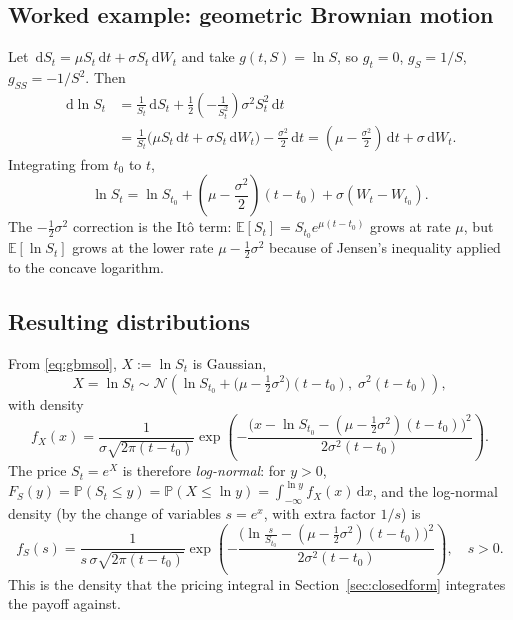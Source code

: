 \documentclass[11pt]{article}
\newcommand{\E}{\mathbb{E}}
\newcommand{\dd}{\,\mathrm{d}}
\begin{document}
\subsection{Worked example: geometric Brownian motion}
Let $\dd S_t = \mu S_t \dd t + \sigma S_t \dd W_t$ and take $g(t,S) = \ln S$, so $g_t = 0$,
$g_S = 1/S$, $g_{SS} = -1/S^2$. Then
\begin{align}
\dd \ln S_t
&= \frac{1}{S_t}\dd S_t + \tfrac12\left(-\frac{1}{S_t^2}\right)\sigma^2 S_t^2 \dd t \nonumber\\
&= \frac{1}{S_t}\bigl(\mu S_t \dd t + \sigma S_t \dd W_t\bigr) - \frac{\sigma^2}{2}\dd t
= \left(\mu - \frac{\sigma^2}{2}\right)\dd t + \sigma \dd W_t.
\end{align}
Integrating from $t_0$ to $t$,
\begin{equation}\label{eq:gbmsol}
\ln S_t = \ln S_{t_0} + \left(\mu - \frac{\sigma^2}{2}\right)(t-t_0) + \sigma (W_t - W_{t_0}).
\end{equation}
The $-\tfrac12\sigma^2$ correction is the It\^o term: $\E[S_t] = S_{t_0}e^{\mu(t-t_0)}$ grows at rate
$\mu$, but $\E[\ln S_t]$ grows at the lower rate $\mu-\tfrac12\sigma^2$ because of Jensen's inequality
applied to the concave logarithm.

\subsection{Resulting distributions}
From \eqref{eq:gbmsol}, $X := \ln S_t$ is Gaussian,
\begin{equation}
X = \ln S_t \sim \mathcal N\!\left(\ln S_{t_0} + \bigl(\mu - \tfrac12\sigma^2\bigr)(t-t_0),\;
\sigma^2 (t-t_0)\right),
\end{equation}
with density
\begin{equation}
f_X(x) = \frac{1}{\sigma\sqrt{2\pi(t-t_0)}}
\exp\!\left(-\frac{\bigl(x - \ln S_{t_0} - (\mu-\tfrac12\sigma^2)(t-t_0)\bigr)^2}{2\sigma^2(t-t_0)}\right).
\end{equation}
The price $S_t = e^{X}$ is therefore \emph{log-normal}: for $y>0$,
$F_S(y) = \mathbb P(S_t\le y) = \mathbb P(X \le \ln y) = \int_{-\infty}^{\ln y} f_X(x)\dd x$, and the
log-normal density (by the change of variables $s=e^x$, with extra factor $1/s$) is
\begin{equation}
f_S(s) = \frac{1}{s\,\sigma\sqrt{2\pi(t-t_0)}}
\exp\!\left(-\frac{\bigl(\ln\tfrac{s}{S_{t_0}} - (\mu-\tfrac12\sigma^2)(t-t_0)\bigr)^2}{2\sigma^2(t-t_0)}\right),
\quad s>0.
\end{equation}
This is the density that the pricing integral in Section~\ref{sec:closedform} integrates the payoff
against.
\end{document}
